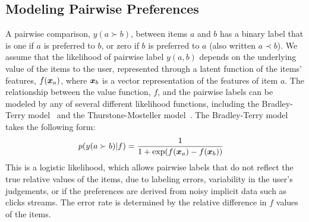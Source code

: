 
\subsection{Modeling Pairwise Preferences}


A pairwise comparison, $y(a \succ b)$, between items $a$ and $b$ 
has a binary label that is one if $a$ is preferred to $b$, 
or zero if $b$ is preferred to $a$ (also written $a \prec b$).
We assume that the likelihood of pairwise label $y(a,b)$ depends on the underlying
value of the items to the user, represented through a latent function of the items' features,
$f(\boldsymbol x_a)$, where $\boldsymbol x_b$ is a vector representation of the features of item $a$.
The relationship between the value function, $f$, and the pairwise labels
can be modeled by any of several different likelihood functions,
including the Bradley-Terry model~\citep{bradley1952rank,plackett1975analysis,luce1959possible}
and the Thurstone-Mosteller model~\citep{thurstone1927law,mosteller2006remarks}.
The Bradley-Terry model takes the following form:
\begin{align}
p(y(a \succ b) | f) & = \frac{1}{1 + \exp( f(\boldsymbol x_a) - f(\boldsymbol x_b) ) }
\end{align}
This is a logistic likelihood, which allows pairwise labels that do not reflect 
the true relative values of the items, due to labeling errors, variability in the user's judgements, or if
the preferences are derived from noisy implicit data such as clicks streams.
The error rate is determined by the relative difference in $f$ values of the items.

